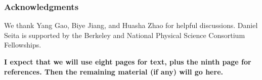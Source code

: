 \documentclass{article} %
\begin{document}
\subsubsection*{Acknowledgments}

We thank Yang Gao, Biye Jiang, and Huasha Zhao for helpful discussions. Daniel Seita is supported by
the Berkeley and National Physical Science Consortium Fellowships.











\clearpage
\appendix

\textbf{I expect that we will use eight pages for text, plus the ninth page for references. Then the
remaining material (if any) will go here.}




\end{document}
